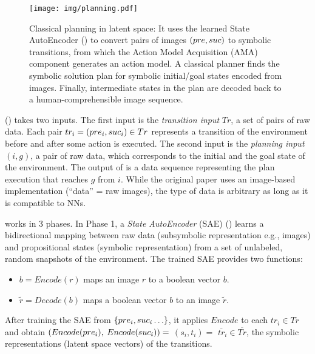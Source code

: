 \begin{figure}[tb]
 \centering
 \texttt{[image: img/planning.pdf]}
 \caption{Classical planning in latent space:
It uses the learned State AutoEncoder () to convert pairs of images $(pre,suc)$ to symbolic transitions,
 from which the Action Model Acquisition (AMA) component generates an action model.
A classical planner finds the symbolic solution plan for symbolic initial/goal states encoded from images.
Finally, intermediate states in the plan are decoded back to a human-comprehensible image sequence.}
\label{fig:overview}
\end{figure}

\latentplanner () takes two inputs.
The first input is the \emph{transition input} $Tr$, a set of pairs of raw data.
Each pair $tr_i=(pre_i, suc_i) \in Tr$ represents a transition of the environment before and after some action is executed.
The second input is the \emph{planning input} $(i, g)$, a pair of raw data, which corresponds to the initial and the goal state of the environment.
The output of \latentplanner is a data sequence representing the plan execution that reaches $g$ from $i$.
While the original paper uses an image-based implementation (``data'' = raw images),
the type of data is arbitrary as long as it is compatible to NNs.


\latentplanner works in 3 phases.
In Phase 1, a \emph{State AutoEncoder} (SAE) () learns a bidirectional mapping between raw data (subsymbolic representation e.g., images)
 and propositional states (symbolic representation) from a set of unlabeled, random snapshots of the environment.
The trained SAE provides two functions:
\begin{itemize} %
\setlength{\itemsep}{-0.3em}
\item $b=Encode(r)$ maps an image  $r$ to a boolean vector $b$.
\item $\tilde{r}=Decode(b)$ maps a boolean vector $b$ to an image $\tilde{r}$.
\end{itemize}
After training the SAE from ${\left\{pre_i, suc_i\ldots\right\}}$,
it applies $Encode$ to each $tr_i \in Tr$ and obtain $(Encode(pre_i),$ $Encode(suc_i))=$ $(s_i,t_i)=$ $\overline{tr}_i\in \overline{Tr}$,
the symbolic representations (latent space vectors) of the transitions.

